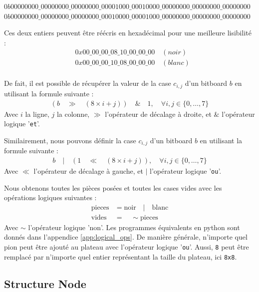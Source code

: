 \begin{center}
$0b00000000\_00000000\_00000000\_00001000\_00010000\_00000000\_00000000\_00000000$ \\
$0b00000000\_00000000\_00000000\_00010000\_00001000\_00000000\_00000000\_00000000$ \\
\end{center}
Ces deux entiers peuvent être réécris en hexadécimal pour une meilleure lisibilité :
\begin{align*}
    &0x00\_00\_00\_08\_10\_00\_00\_00 \quad (noir)\\
    &0x00\_00\_00\_10\_08\_00\_00\_00 \quad (blanc)\\
\end{align*}

De fait, il est possible de récupérer la valeur de la case $c_{i,j}$ d'un bitboard $b$ en utilisant la formule suivante : 
\begin{align*}
    (b\quad \gg\quad (8\times i+j))\quad \&\quad 1, \quad \forall i,j \in \{0,\dots,7\}
\end{align*}
Avec $i$ la ligne, $j$ la colonne, $\gg$ l'opérateur de décalage à droite, et $\&$ l'opérateur logique '\texttt{et}'.

Similairement, nous pouvons définir la case $c_{i,j}$ d'un bitboard $b$ en utilisant la formule suivante :
\begin{align*}
    b\quad |\quad (1\quad \ll\quad (8\times i+j)), \quad \forall i,j \in \{0,\dots,7\}
\end{align*}
Avec $\ll$ l'opérateur de décalage à gauche, et $|$ l'opérateur logique '\texttt{ou}'.

Nous obtenons toutes les pièces posées et toutes les cases vides avec les opérations logiques suivantes :
\begin{align*}
    \text{pieces} &= \text{noir} \quad | \quad \text{blanc} \\
    \text{vides} &= \quad\sim\text{pieces}
\end{align*}
Avec $\sim$ l'opérateur logique 'non'. Les programmes équivalents en python sont donnés dans l'appendice \ref{app:logical_ops}. De manière générale, n'importe quel pion peut être ajouté au plateau avec l'opérateur logique '\texttt{ou}'. Aussi, \texttt{8} peut être remplacé par n'importe quel entier représentant la taille du plateau, ici \texttt{8x8}.

\subsection{Structure Node}
\label{subsec:node}




